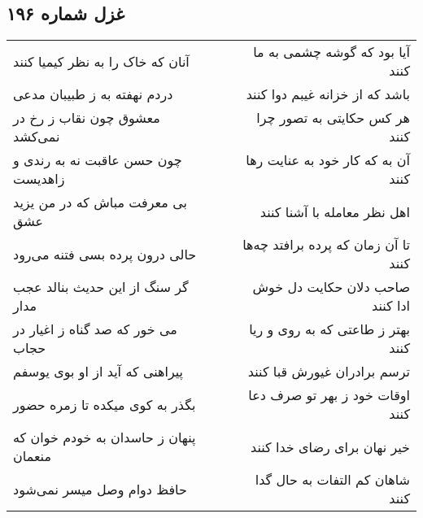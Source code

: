 \begin{center}
\section*{غزل شماره ۱۹۶}
\label{sec:sh196}
\begin{longtable}{l p{0.5cm} r}
آنان که خاک را به نظر کیمیا کنند
&&
آیا بود که گوشه چشمی به ما کنند
\\
دردم نهفته به ز طبیبان مدعی
&&
باشد که از خزانه غیبم دوا کنند
\\
معشوق چون نقاب ز رخ در نمی‌کشد
&&
هر کس حکایتی به تصور چرا کنند
\\
چون حسن عاقبت نه به رندی و زاهدیست
&&
آن به که کار خود به عنایت رها کنند
\\
بی معرفت مباش که در من یزید عشق
&&
اهل نظر معامله با آشنا کنند
\\
حالی درون پرده بسی فتنه می‌رود
&&
تا آن زمان که پرده برافتد چه‌ها کنند
\\
گر سنگ از این حدیث بنالد عجب مدار
&&
صاحب دلان حکایت دل خوش ادا کنند
\\
می خور که صد گناه ز اغیار در حجاب
&&
بهتر ز طاعتی که به روی و ریا کنند
\\
پیراهنی که آید از او بوی یوسفم
&&
ترسم برادران غیورش قبا کنند
\\
بگذر به کوی میکده تا زمره حضور
&&
اوقات خود ز بهر تو صرف دعا کنند
\\
پنهان ز حاسدان به خودم خوان که منعمان
&&
خیر نهان برای رضای خدا کنند
\\
حافظ دوام وصل میسر نمی‌شود
&&
شاهان کم التفات به حال گدا کنند
\\
\end{longtable}
\end{center}
